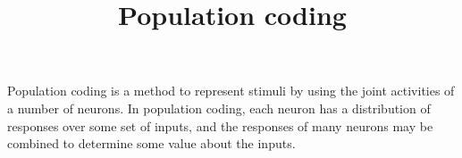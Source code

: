 \documentclass[a4paper]{article}
\title{Population coding}
\date{}
\begin{document}
\maketitle
    Population coding is a method to represent stimuli by using the joint activities of a number of neurons. In population coding, each neuron has a distribution of responses over some set of inputs, and the responses of many neurons may be combined to determine some value about the inputs.
    
    
\end{document}
